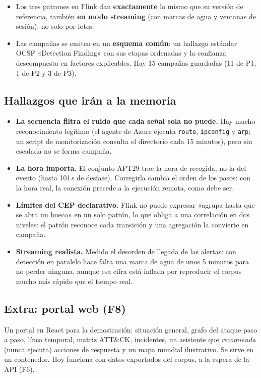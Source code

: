 \documentclass[11pt,a4paper]{article}
\newcommand{\cod}[1]{\texttt{\small #1}}
\begin{document}
\begin{dato}
\begin{itemize}[leftmargin=*,itemsep=1pt]
  \item Los tres patrones en Flink dan \textbf{exactamente} lo mismo que su versión de referencia, también
        \textbf{en modo streaming} (con marcas de agua y ventanas de sesión), no solo por lotes.
  \item Las campañas se emiten en un \textbf{esquema común}: un hallazgo estándar OCSF «Detection Finding» con sus
        etapas ordenadas y la confianza descompuesta en factores explicables. Hay 15 campañas guardadas (11 de P1,
        1 de P2 y 3 de P3).
\end{itemize}
\end{dato}

\subsection{Hallazgos que irán a la memoria}
\begin{itemize}[leftmargin=*,itemsep=2pt]
  \item \textbf{La secuencia filtra el ruido que cada señal sola no puede.} Hay mucho reconocimiento legítimo (el
        agente de Azure ejecuta \cod{route}, \cod{ipconfig} y \cod{arp}; un script de monitorización consulta el
        directorio cada 15 minutos), pero sin escalada no se forma campaña.
  \item \textbf{La hora importa.} El conjunto APT29 trae la hora de recogida, no la del evento (hasta 101\,s de
        desfase). Corregirla cambia el orden de los pasos: con la hora real, la conexión precede a la ejecución remota,
        como debe ser.
  \item \textbf{Límites del CEP declarativo.} Flink no puede expresar «agrupa hasta que se abra un hueco» en un solo
        patrón, lo que obliga a una correlación en dos niveles: el patrón reconoce cada transición y una agregación la
        convierte en campaña.
  \item \textbf{Streaming realista.} Medido el desorden de llegada de las alertas: con detección en paralelo hace falta
        una marca de agua de unos 5 minutos para no perder ninguna, aunque esa cifra está inflada por reproducir el corpus mucho más rápido que el tiempo real.
\end{itemize}

\subsection{Extra: portal web (F8)}
Un portal en React para la demostración: situación general, grafo del ataque paso a paso, línea temporal, matriz
ATT\&CK, incidentes, un asistente que \emph{recomienda} (nunca ejecuta) acciones de respuesta y un mapa mundial
ilustrativo. Se sirve en un contenedor. Hoy funciona con datos exportados del corpus, a la espera de la API (F6).
\end{document}
